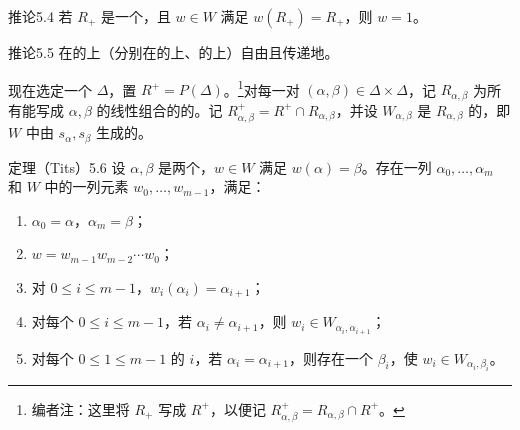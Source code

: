 \begin{SGAresult}{推论}{5.4}
若 $R_+$ 是一个，且 $w\in W$ 满足 $w(R_+)=R_+$，则 $w=1$。
\end{SGAresult}
\begin{SGAresult}{推论}{5.5}
在的上（分别在的上、的上）自由且传递地。
\end{SGAresult}
现在选定一个 $\Delta$，置 $R^+=P(\Delta)$。\footnote{编者注：这里将 $R_+$ 写成 $R^+$，以便记 $R_{\alpha,\beta}^+=R_{\alpha,\beta}\cap R^+$。}对每一对 $(\alpha,\beta)\in\Delta\times\Delta$，记 $R_{\alpha,\beta}$ 为所有能写成 $\alpha,\beta$ 的线性组合的的。记 $R_{\alpha,\beta}^+=R^+\cap R_{\alpha,\beta}$，并设 $W_{\alpha,\beta}$ 是 $R_{\alpha,\beta}$ 的，即 $W$ 中由 $s_\alpha,s_\beta$ 生成的。
\begin{SGAresult}{定理（Tits）}{5.6}
设 $\alpha,\beta$ 是两个，$w\in W$ 满足 $w(\alpha)=\beta$。存在一列 $\alpha_0,\ldots,\alpha_m$ 和 $W$ 中的一列元素 $w_0,\ldots,w_{m-1}$，满足：
\begin{enumerate}
\item[(i)] $\alpha_0=\alpha$，$\alpha_m=\beta$；
\item[(ii)] $w=w_{m-1}w_{m-2}\cdots w_0$；
\item[(iii)] 对 $0\leq i\leq m-1$，$w_i(\alpha_i)=\alpha_{i+1}$；
\item[(iv)] 对每个 $0\leq i\leq m-1$，若 $\alpha_i\ne\alpha_{i+1}$，则 $w_i\in W_{\alpha_i,\alpha_{i+1}}$；
\item[(v)] 对每个 $0\leq1\leq m-1$ 的 $i$，若 $\alpha_i=\alpha_{i+1}$，则存在一个 $\beta_i$，使 $w_i\in W_{\alpha_i,\beta_i}$。
\end{enumerate}
\end{SGAresult}

